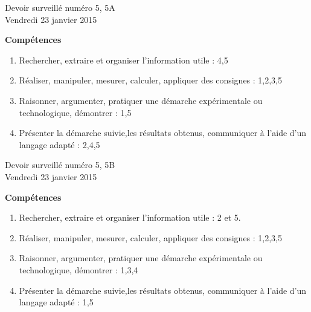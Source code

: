 \documentclass[a4paper,10pt]{article}
\begin{document}
\begin{feuilleDS}{Devoir surveillé numéro 5, 5A\\ \small Vendredi 23 janvier 2015}

\vspace{1cm}
{\bf Compétences}
\begin{enumerate}
    \item
        Rechercher, extraire et organiser l'information utile : 4,5
    \item
        Réaliser, manipuler, mesurer, calculer, appliquer des consignes : 1,2,3,5
    \item
        Raisonner, argumenter, pratiquer une démarche expérimentale ou technologique, démontrer : 1,5
    \item 
        Présenter la démarche suivie,les résultats obtenus, communiquer à l'aide d’un langage adapté : 2,4,5
\end{enumerate}


\end{feuilleDS}

\begin{feuilleDS}{Devoir surveillé numéro 5, 5B\\ \small Vendredi 23 janvier 2015}

\vspace{1cm}
{\bf Compétences}
\begin{enumerate}
    \item
        Rechercher, extraire et organiser l'information utile : 2 et 5.
    \item
Réaliser, manipuler, mesurer, calculer, appliquer des consignes : 1,2,3,5
\item
Raisonner, argumenter, pratiquer une démarche expérimentale ou technologique, démontrer : 1,3,4
\item 
Présenter la démarche suivie,les résultats obtenus, communiquer à l'aide d’un langage adapté : 1,5
\end{enumerate}

\end{feuilleDS}
\end{document}
